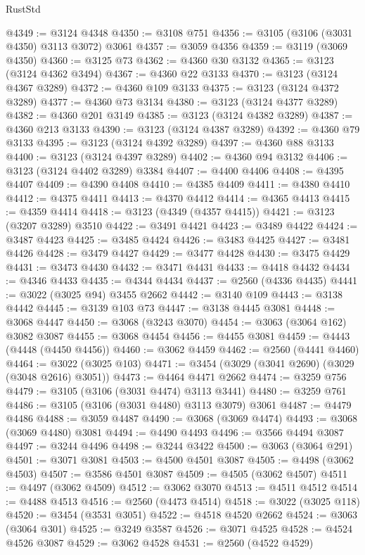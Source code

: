 \begin{lexlean}{RustStd}
\begin{coremodule}
@4349 := @3124 @4348
@4350 := @3108 @751
@4356 := @3105 (@3106 (@3031 @4350) @3113 @3072) @3061
@4357 := @3059 @4356
@4359 := @3119 (@3069 @4350)
@4360 := @3125 @73
@4362 := @4360 @30 @3132
@4365 := @3123 (@3124 @4362 @3494)
@4367 := @4360 @22 @3133
@4370 := @3123 (@3124 @4367 @3289)
@4372 := @4360 @109 @3133
@4375 := @3123 (@3124 @4372 @3289)
@4377 := @4360 @73 @3134
@4380 := @3123 (@3124 @4377 @3289)
@4382 := @4360 @201 @3149
@4385 := @3123 (@3124 @4382 @3289)
@4387 := @4360 @213 @3133
@4390 := @3123 (@3124 @4387 @3289)
@4392 := @4360 @79 @3133
@4395 := @3123 (@3124 @4392 @3289)
@4397 := @4360 @88 @3133
@4400 := @3123 (@3124 @4397 @3289)
@4402 := @4360 @94 @3132
@4406 := @3123 (@3124 @4402 @3289) @3384
@4407 := @4400 @4406
@4408 := @4395 @4407
@4409 := @4390 @4408
@4410 := @4385 @4409
@4411 := @4380 @4410
@4412 := @4375 @4411
@4413 := @4370 @4412
@4414 := @4365 @4413
@4415 := @4359 @4414
@4418 := @3123 (@4349 (@4357 @4415))
@4421 := @3123 (@3207 @3289) @3510
@4422 := @3491 @4421
@4423 := @3489 @4422
@4424 := @3487 @4423
@4425 := @3485 @4424
@4426 := @3483 @4425
@4427 := @3481 @4426
@4428 := @3479 @4427
@4429 := @3477 @4428
@4430 := @3475 @4429
@4431 := @3473 @4430
@4432 := @3471 @4431
@4433 := @4418 @4432
@4434 := @4346 @4433
@4435 := @4344 @4434
@4437 := @2560 (@4336 @4435)
@4441 := @3022 (@3025 @94) @3455 @2662
@4442 := @3140 @109
@4443 := @3138 @4442
@4445 := @3139 @103 @73
@4447 := @3138 @4445 @3081
@4448 := @3068 @4447
@4450 := @3068 (@3243 @3070)
@4454 := @3063 (@3064 @162) @3082 @3087
@4455 := @3068 @4454
@4456 := @4455 @3081
@4459 := @4443 (@4448 (@4450 @4456))
@4460 := @3062 @4459
@4462 := @2560 (@4441 @4460)
@4464 := @3022 (@3025 @103)
@4471 := @3454 (@3029 (@3041 @2690) (@3029 (@3048 @2616) @3051))
@4473 := @4464 @4471 @2662
@4474 := @3259 @756
@4479 := @3105 (@3106 (@3031 @4474) @3113 @3441)
@4480 := @3259 @761
@4486 := @3105 (@3106 (@3031 @4480) @3113 @3079) @3061
@4487 := @4479 @4486
@4488 := @3059 @4487
@4490 := @3068 (@3069 @4474)
@4493 := @3068 (@3069 @4480) @3081
@4494 := @4490 @4493
@4496 := @3566 @4494 @3087
@4497 := @3244 @4496
@4498 := @3244 @3422
@4500 := @3063 (@3064 @291)
@4501 := @3071 @3081
@4503 := @4500 @4501 @3087
@4505 := @4498 (@3062 @4503)
@4507 := @3586 @4501 @3087
@4509 := @4505 (@3062 @4507)
@4511 := @4497 (@3062 @4509)
@4512 := @3062 @3070
@4513 := @4511 @4512
@4514 := @4488 @4513
@4516 := @2560 (@4473 @4514)
@4518 := @3022 (@3025 @118)
@4520 := @3454 (@3531 @3051)
@4522 := @4518 @4520 @2662
@4524 := @3063 (@3064 @301)
@4525 := @3249 @3587
@4526 := @3071 @4525
@4528 := @4524 @4526 @3087
@4529 := @3062 @4528
@4531 := @2560 (@4522 @4529)

\end{coremodule}
\end{lexlean}
